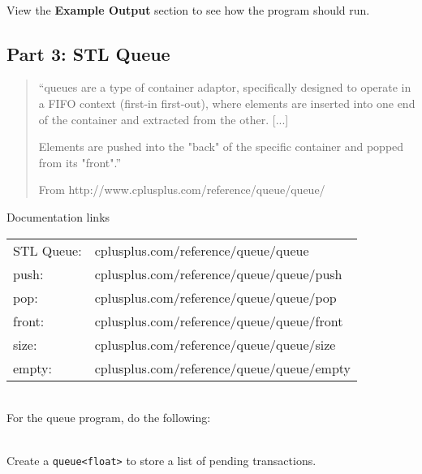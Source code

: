         ~\\ View the \textbf{Example Output} section to see how the program should run.


        \newpage
        \subsection{Part 3: STL Queue}

        \begin{mdframed}
            \begin{quote}
                ``queues are a type of container adaptor, specifically designed to operate in a FIFO context (first-in first-out), where elements are inserted into one end of the container and extracted from the other. [...]

                Elements are pushed into the "back" of the specific container and popped from its "front".''

                \footnotesize{From http://www.cplusplus.com/reference/queue/queue/}
            \end{quote}
        \end{mdframed}
        
        \begin{hint}{Documentation links} ~\\
            \begin{tabular}{ l l }
                STL Queue:      & cplusplus.com/reference/queue/queue \\
                push:           & cplusplus.com/reference/queue/queue/push \\
                pop:            & cplusplus.com/reference/queue/queue/pop \\
                front:          & cplusplus.com/reference/queue/queue/front \\
                size:           & cplusplus.com/reference/queue/queue/size \\
                empty:          & cplusplus.com/reference/queue/queue/empty \\
            \end{tabular}
        \end{hint}

        ~\\ For the queue program, do the following:

        ~\\ Create a \texttt{queue<float>} to store a list of pending transactions.

